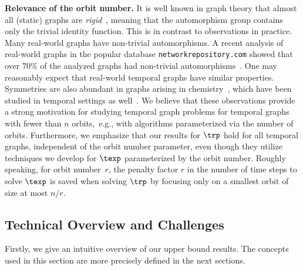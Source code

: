 { \textbf{Relevance of the orbit number.} {It is well
known in graph theory}
    that almost all (static) graphs are \textit{rigid}~\cite{BallGS18},
    meaning that the automorphism group contains only the trivial
    identity function. This is in contrast to observations in practice.
    Many real-world graphs have non-trivial automorphisms. A recent
    analysis of real-world graphs in the popular database
    \texttt{networkrepository.com} showed that over $70\%$ of the analyzed
    graphs had non-trivial automorphisms~\cite{BallGS18}. One may
    reasonably expect that real-world temporal graphs have similar
    properties. Symmetries are also abundant in graphs arising in
    chemistry~\cite{Balasubramanian82}, which have been studied in temporal
    settings as well~\cite{PlamperLH23}.
	{We believe that these observations provide a strong
	motivation for studying temporal graph problems for temporal
	graphs with fewer than $n$ orbits,{\ e.g., with
    algorithms parameterized via the number of orbits.}}
	{Furthermore, we emphasize that
    our results for $\trp$ {hold for all temporal graphs,}
	independent of the orbit number parameter,
even {though} they {utilize} techniques we develop for $\texp$
parameterized by the orbit number.} {Roughly speaking,
for orbit number~$r$, the penalty factor $r$ in the number of time steps 
to solve $\texp$ is saved when solving $\trp$ by focusing only on a smallest orbit of size at most $n/r$.
}
}

\subsection{Technical Overview and Challenges}
\label{subsec:tech-overview-challenges}


Firstly, we give an intuitive overview of our upper bound results. The concepts
used in this section are more precisely defined in the next sections.

